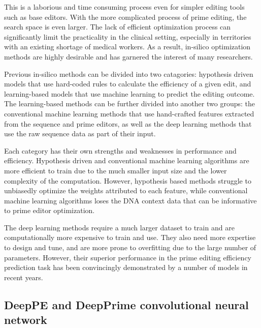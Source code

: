 This is a laborious and time consuming process even for simpler editing tools such as base editors. With the more complicated process of prime editing, the search space is even larger. The lack of efficient optimization process can significantly limit the practicality in the clinical setting, especially in territories with an existing shortage of medical workers. As a result, in-silico optimization methods are highly desirable and has garnered the interest of many researchers.

Previous in-silico methods can be divided into two catagories: hypothesis driven models that use hard-coded rules to calculate the efficiency of a given edit\cite{hsuPrimeDesignSoftwareRapid2021,hwangPEDesignerPEAnalyzerWebbased2021}, and learning-based models that use machine learning to predict the editing outcome. 
The learning-based methods can be further divided into another two groups: the conventional machine learning methods that use hand-crafted features extracted from the sequence and prime editors\cite{liEasyPrimeMachineLearning2021,koeppelPredictionPrimeEditing2023}, as well as the deep learning methods that use the raw sequence data as part of their input\cite{yuPredictionEfficienciesDiverse2023,kimPredictingEfficiencyPrime2021, mathisPredictingPrimeEditing2023}. 

Each category has their own strengths and weaknesses in performance and efficiency. Hypothesis driven and conventional machine learning algorithms are more efficient to train due to the much smaller input size and the lower complexity of the computation. However, hypothesis based methods struggle to unbiasedly optimize the weights attributed to each feature\cite{liEasyPrimeMachineLearning2021}, while conventional machine learning algorithms loses the DNA context data that can be informative to prime editor optimization. 

The deep learning methods require a much larger dataset to train and are computationally more expensive to train and use. They also need more expertise to design and tune, and are more prone to overfitting due to the large number of parameters. However, their superior performance in the prime editing efficiency prediction task has been convincingly demonstrated by a number of models in recent years.


\subsection{DeepPE and DeepPrime convolutional neural network}


